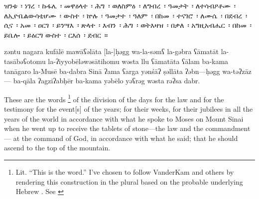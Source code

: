 
\begin{ethiopictext}
        ዝንቱ~፡ ነገረ~፡ ኩፋሌ~፡
        መዋዕላተ~፡ ሕግ~፡ ወለስምዕ~፡
        ለግብረ~፡ ዓመታት~፡ ለተሳብዖቶሙ~፡ 
        ለኢዮቤልውሳቲሆሙ~፡ ውስተ~፡ ኵሉ~፡ ዓመታተ~፡ ዓለም~፡
        በከመ~፡ ተናገሮ~፡ ለሙሴ~፡ በደብረ~፡ ሲና~፡
        አመ~፡ ዐርገ~፡ ይንሣእ~፡ ጽላተ~፡ እብን~፡ ሕግ~፡ ወትእዛዝ~፡ 
        በቃለ~፡ አግዚአብሔር~፡ በከመ~፡ ይቤሎ~፡ ይዕርግ ውስተ~፡ ርእሰ~፡ ደብር~።
\end{ethiopictext}

\begin{transliteration}
        zəntu nagara kufālē
        mawāʕəlāta [la-]ḥəgg wa-la-səmʕ
        la-gəbra ʕāmatāt la-tasābəʕotomu
        la-ʔiyyobēləwəsātihomu wəsta llu ʕāmatāta ʕālam
        ba-kama tanāgaro la-Musē ba-dabra Sinā
        ʔama ʕarga yənśāʔ ṣəllāta ʔəbn---ḥəgg wa-təʔzāz---%
        ba-qāla ʔagziʔabḥēr ba-kama yəbēlo yəʕrəg wəsta rəʔsa dabr.
\end{transliteration}

\begin{translation}
        These are the words%
        \footnote{Lit. ``This is the word.'' I've chosen to follow VanderKam and others by rendering this construction in the plural based on the probable underlying Hebrew . See \cite[125]{vanderkam2018}}
        of the division 
        of the days for the law and for the testimony
        for the event[s] of the years; for their weeks,
        for their jubilees in all the years of the world
        in accordance with what he spoke to Moses on Mount Sinai 
        when he went up to receive the tablets of stone---the law and the commandment---%
        at the command of God, in accordance with what he said;
        that he should ascend to the top of the mountain.
\end{translation}